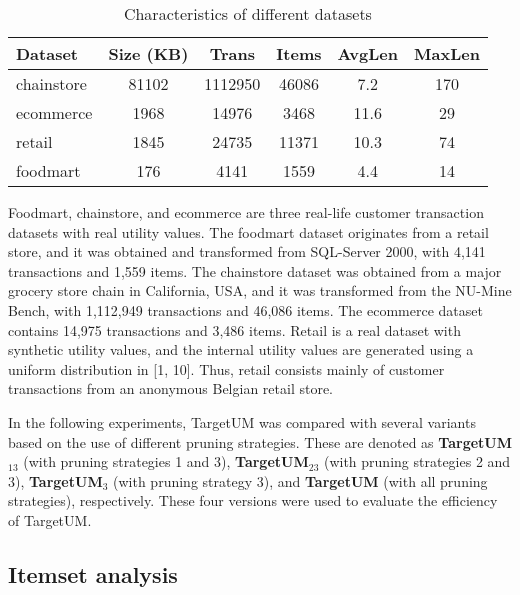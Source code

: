 \documentclass[journal]{IEEEtran}
\begin{document}
\begin{table}[!htb]
	\centering	
	\caption {Characteristics of different datasets \label{tab:dataset}}
	\begin{tabular}{|l|c|c|c|c|c|}
		\hline 
		\textbf{Dataset} & \textbf{Size (KB)} & \textbf{Trans} & \textbf{Items} & \textbf{AvgLen} & \textbf{MaxLen} \\  \hline
		chainstore & 81102 & 1112950 & 46086 & 7.2 & 170 \\
		ecommerce & 1968 & 14976 & 3468 & 11.6 & 29 \\
		retail & 1845 & 24735 & 11371 & 10.3 & 74 \\
		foodmart & 176 & 4141 & 1559 & 4.4 & 14 \\ \hline 	
	\end{tabular}	
\end{table}

Foodmart, chainstore, and ecommerce are three real-life customer transaction datasets with real utility values. The foodmart dataset originates from a retail store, and it was obtained and transformed from SQL-Server 2000, with 4,141 transactions and 1,559 items. The chainstore dataset was obtained from a major grocery store chain in California, USA, and it was transformed from the NU-Mine Bench, with 1,112,949 transactions and 46,086 items. The ecommerce dataset contains 14,975 transactions and 3,486 items. Retail is a real dataset with synthetic utility values, and the internal utility values are generated using a uniform distribution in [1, 10]. Thus, retail consists mainly of customer transactions from an anonymous Belgian retail store.


In the following experiments, TargetUM was compared with several variants based on the use of different pruning strategies. These are denoted as \textbf{TargetUM$_{13}$} (with pruning strategies 1 and 3), \textbf{TargetUM}$_{23}$ (with pruning strategies 2 and 3), \textbf{TargetUM}$_3$ (with pruning strategy 3), and \textbf{TargetUM} (with all pruning strategies), respectively. These four versions were used to evaluate the efficiency of TargetUM.

\subsection{Itemset analysis}
\end{document}
